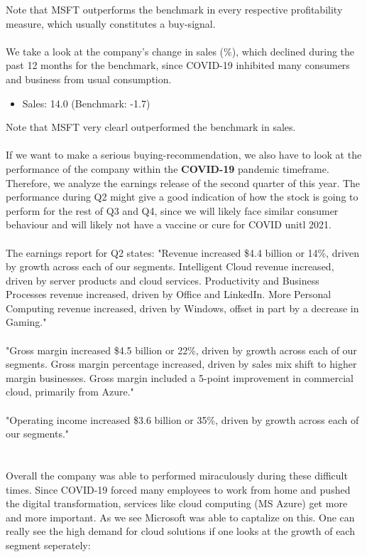 \documentclass[]{article}
\begin{document}
\noindent Note that MSFT outperforms the benchmark in every respective profitability measure, which usually constitutes a  buy-signal. \\\\
We take a look at the company's change in sales (\%), which declined during the past 12 months for the benchmark, since COVID-19 inhibited many consumers and business from usual consumption.
\begin{itemize}
	\item Sales: 14.0 (Benchmark: -1.7)
\end{itemize}
Note that MSFT very clearl outperformed the benchmark in sales.\\\\
\noindent If we want to make a serious buying-recommendation, we also have to look at the performance of the company within the \textbf{COVID-19} pandemic timeframe. Therefore, we analyze the earnings release of the second quarter of this year. The performance during Q2 might give a good indication of how the stock is going to perform for the rest of Q3 and Q4, since we will likely face similar consumer behaviour and will likely not have a vaccine or cure for COVID unitl 2021.\\\\
The earnings report for Q2 states: "Revenue increased \$4.4 billion or 14\%, driven by growth across each of our segments. Intelligent Cloud revenue increased, driven by server products and cloud services. Productivity and Business Processes revenue increased, driven by Office and LinkedIn. More Personal Computing revenue increased, driven by Windows, offset in part by a decrease in Gaming."\cite{microsoft}\\\\
"Gross margin increased \$4.5 billion or 22\%, driven by growth across each of our segments. Gross margin percentage increased, driven by sales mix shift to higher margin businesses. Gross margin included a 5-point improvement in commercial cloud, primarily from Azure."\cite{microsoft}\\\\
"Operating income increased \$3.6 billion or 35\%, driven by growth across each of our segments."\\ \cite{microsoft}\\\\
Overall the company was able to performed miraculously during these difficult times. Since COVID-19 forced many employees to work from home and pushed the digital transformation, services like cloud computing (MS Azure) get more and more important. As we see Microsoft was able to captalize on this. One can really see the high demand for cloud solutions if one looks at the growth of each segment seperately:\cite{microsoft}
\end{document}
